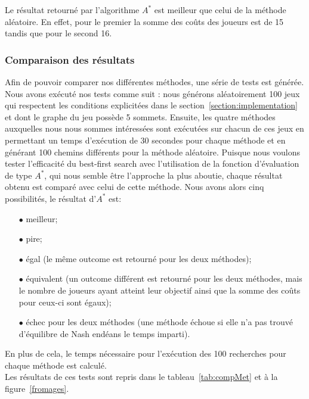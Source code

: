 Le résultat retourné par l'algorithme $A^*$ est meilleur que celui de la méthode aléatoire. En effet, pour le premier la somme des coûts des joueurs est de 15 tandis que pour le second 16. 

\subsubsection*{Comparaison des résultats}

Afin de pouvoir comparer nos différentes méthodes, une série de tests est générée. Nous avons exécuté nos tests comme suit : nous générons aléatoirement 100 jeux qui respectent les conditions explicitées dans le section~\ref{section:implementation} et dont le graphe du jeu possède 5 sommets. Ensuite, les quatre méthodes auxquelles nous nous sommes intéressées sont exécutées sur chacun de ces jeux en permettant un temps d'exécution de 30 secondes pour chaque méthode et en générant 100 chemins différents pour la méthode aléatoire. Puisque nous voulons tester l'efficacité du best-first search avec l'utilisation de la fonction d'évaluation de type $A^*$, qui nous semble être l'approche la plus aboutie, chaque résultat obtenu est comparé avec celui de cette méthode. Nous avons alors cinq possibilités, le résultat d'$A^*$ est:
\begin{itemize}
	\item[$\bullet$] meilleur;
	\item[$\bullet$] pire;
	\item[$\bullet$] égal (le même outcome est retourné pour les deux méthodes);
	\item[$\bullet$] équivalent (un outcome différent est retourné pour les deux méthodes, mais le nombre de joueurs ayant atteint leur objectif ainsi que la somme des coûts pour ceux-ci sont égaux);
	\item[$\bullet$] échec pour les deux méthodes (une méthode échoue si elle n'a pas trouvé d'équilibre de Nash endéans le temps imparti).
\end{itemize}

En plus de cela, le temps nécessaire pour l'exécution des 100 recherches pour chaque méthode est calculé.\\
Les résultats de ces tests sont repris dans le tableau~\ref{tab:compMet} et à la figure~\ref{fromages}.

